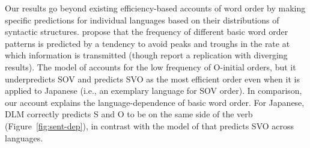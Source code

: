 \documentclass[9pt,twocolumn,twoside,lineno]{pnas-new}
\begin{document}
Our results go beyond existing efficiency-based accounts of word order by making specific predictions for individual languages based on their distributions of syntactic structures.
\cite{maurits2010why} propose that the frequency of different basic word order patterns is predicted by a tendency to avoid peaks and troughs in the rate at which information is transmitted (though \cite{gonering-morgan-2020-processing} report a replication with diverging results).
The model of \cite{maurits2010why} accounts for the low frequency of O-initial orders, but it underpredicts SOV and predicts SVO as the most efficient order even when it is applied to Japanese (i.e., an exemplary language for SOV order).
In comparison, our account explains the language-dependence of basic word order.
For Japanese, DLM correctly predicts S and O to be on the same side of the verb (Figure~\ref{fig:sent-dep}), in contrast with the model of \cite{maurits2010why} that predicts SVO across languages. %


\end{document}
